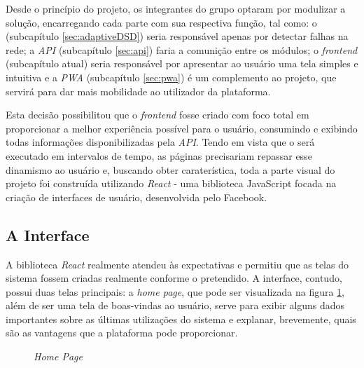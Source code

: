 Desde o princípio do projeto, os integrantes do grupo optaram por modulizar a solução, encarregando cada parte com sua respectiva função, tal como: o \adaptive{} (subcapítulo \ref{sec:adaptiveDSD}) seria responsável apenas por detectar falhas na rede; a \textit{API} (subcapítulo \ref{sec:api}) faria a comunição entre os módulos; o \textit{frontend} (subcapítulo atual) seria responsável por apresentar ao usuário uma tela simples e intuitiva e a \textit{PWA} (subcapítulo \ref{sec:pwa}) é um complemento ao projeto, que servirá para dar mais mobilidade ao utilizador da plataforma.

Esta decisão possibilitou que o \textit{frontend} fosse criado com foco total em proporcionar a melhor experiência possível para o usuário, consumindo e exibindo todas informações disponibilizadas pela \textit{API}. Tendo em vista que o \adaptive{}será executado em intervalos de tempo, as páginas precisariam repassar esse dinamismo ao usuário e, buscando obter caraterística, toda a parte visual do projeto foi construída utilizando \textit{React} - uma biblioteca JavaScript focada na criação de interfaces de usuário, desenvolvida pelo Facebook.


\subsection{A Interface}
\label{sec:a_interface}

A biblioteca \textit{React} realmente atendeu às expectativas e permitiu que as telas do sistema fossem criadas realmente conforme o pretendido. A interface, contudo, possui duas telas principais: a \textit{home page}, que pode ser visualizada na figura \ref{fig:home_page}, além de ser uma tela de boas-vindas ao usuário, serve para exibir alguns dados importantes sobre as últimas utilizações do sistema e explanar, brevemente, quais são as vantagens que a plataforma pode proporcionar.

\begin{figure}[H]
    \centering
    \caption{\textit{Home Page}}
    \label{fig:home_page}
\end{figure}

